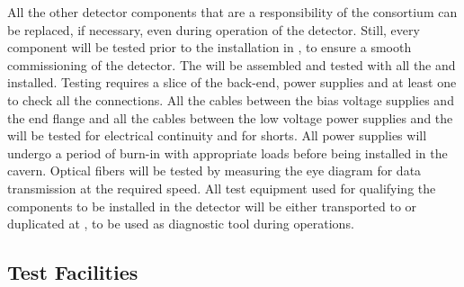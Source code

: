 All the other detector components that are a responsibility of
the  consortium can be replaced, if necessary,
even during operation of the detector. Still, every component
will be tested prior to the installation in \surf, to ensure a
smooth commissioning of the detector. The  will be
assembled and tested with all the  and 
installed. Testing requires a slice of the  back-end,
power supplies and at least one  to check all the
connections. All the cables between the bias voltage supplies and
the end flange and all the cables between the low voltage power
supplies and the  will be tested for electrical
continuity and for shorts. All power supplies will undergo a
period of burn-in with appropriate loads before being installed
in the cavern. Optical fibers will be tested by measuring the
eye diagram for data transmission at the required speed. All
test equipment used for qualifying the components to be installed
in the detector will be either transported to \surf or duplicated
at \surf, to be used as diagnostic tool during operations.

\subsection{Test Facilities}
\label{sec:fdsp-tpcelec-production-facilities}

